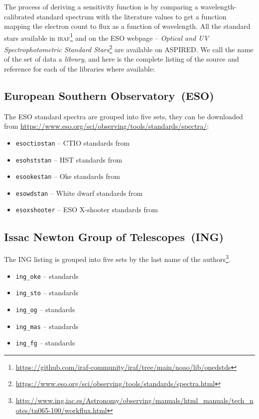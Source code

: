 \documentclass[linenumbers, twocolumn]{aastex631}
\begin{document}
The process of deriving a sensitivity function is by comparing a
wavelength-calibrated standard spectrum with the literature values to get a
function mapping the electron count to flux as a function of wavelength. All
the standard stars available in
\textsc{iraf}\footnote{\url{https://github.com/iraf-community/iraf/tree/main/noao/lib/onedstds}}
and on the ESO webpage -- \textit{Optical and UV Spectrophotometric Standard 
Stars}\footnote{\url{https://www.eso.org/sci/observing/tools/standards/spectra.html}}
are available on \textsc{ASPIRED}. We call the name of the set of data a
\textit{library}, and here is the complete listing of the source and reference
for each of the libraries where available:

\subsection*{European Southern Observatory~(ESO)}
The ESO standard spectra are grouped into five sets, they can be downloaded from \url{https://www.eso.org/sci/observing/tools/standards/spectra/}:

\begin{itemize}
    \item \texttt{esoctiostan} -- CTIO standards from \citet{1992PASP..104..533H, 1994PASP..106..566H}
    \item \texttt{esohststan} -- HST standards from \citet{1995AJ....110.1316B, 1996AJ....111.1743B}
    \item \texttt{esookestan} -- Oke standards from \citet{1990AJ.....99.1621O}
    \item \texttt{esowdstan} -- White dwarf standards from \citet{1995AJ....110.1316B}
    \item \texttt{esoxshooter} -- ESO X-shooter standards from \citet{2014Msngr.158...16M, 2014A&A...568A...9M}
\end{itemize}


\subsection*{Issac Newton Group of Telescopes~(ING)}

The ING listing is grouped into five sets by the last name of the authors\footnote{\url{http://www.ing.iac.es/Astronomy/observing/manuals/html_manuals/tech_notes/tn065-100/workflux.html}}.

\begin{itemize}
    \item \texttt{ing\_oke} -- \citet{1990AJ.....99.1621O} standards
    \item \texttt{ing\_sto} -- \citet{1977ApJ...218..767S} standards
    \item \texttt{ing\_og} -- \citet{1983ApJ...266..713O} standards
    \item \texttt{ing\_mas} -- \citet{1988ApJ...328..315M} standards
    \item \texttt{ing\_fg} -- \citet{1984PASP...96..530F} standards
\end{itemize}
\end{document}
